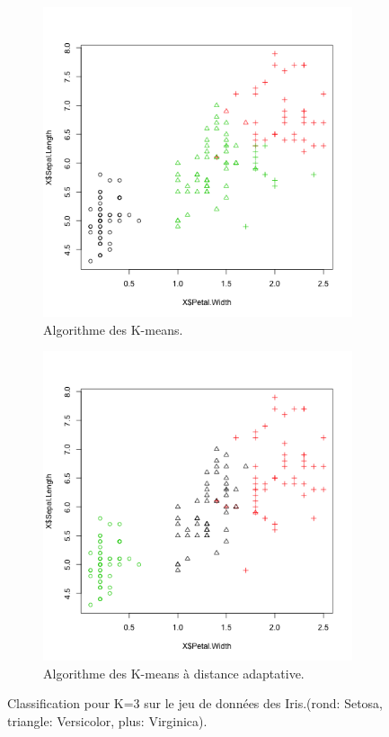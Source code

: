 \documentclass[a4paper,11pt,oneside,roman]{article}
\begin{document}
    \begin{figure}
        \centering
        \begin{subfigure}{.5\textwidth}
          \centering
          \includegraphics[width=.8\linewidth]{imgs/K_means_iris_3_sepal_petal.png}
          \caption{Algorithme des K-means.}
        \end{subfigure}%
        \begin{subfigure}{.5\textwidth}
          \centering
          \includegraphics[width=.8\linewidth]{imgs/K_means_adapt_iris_3_sepal_petal.png}
          \caption{Algorithme des K-means à distance adaptative.}
        \end{subfigure}
        \caption{Classification pour K=3 sur le jeu de données des Iris.(rond: Setosa, triangle: Versicolor, plus: Virginica).}
        \label{fig_Iris_3_sepal_petal}
    \end{figure}
\end{document}
